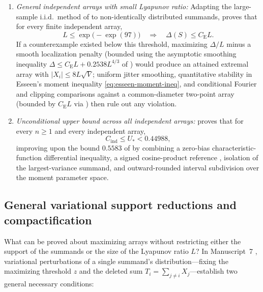 \documentclass[11pt]{article}
\numberwithin{equation}{section}
\theoremstyle{definition}
\theoremstyle{remark}
\newcommand{\ce}{C_{\mathrm E}}
\newcommand{\Cind}{C_{\mathrm{ind}}}
\begin{document}
\begin{enumerate}[label=(\arabic*),leftmargin=2em]
\item \emph{General independent arrays with small Lyapunov ratio:}
Adapting the large-sample i.i.d.\ method of \citet{HeCheng2026} to
non-identically distributed summands, \citet[Theorem~1.1]{BellSmall2026}
proves that for every finite independent array,
\begin{equation}\label{eq:small-lyapunov-value}
 L\le\exp\bigl(-\exp(97)\bigr)
 \quad\Longrightarrow\quad
 \Delta(S)\le\ce L.
\end{equation}
If a counterexample existed below this threshold, maximizing $\Delta/L$ minus
a smooth localization penalty (bounded using the asymptotic smoothing
inequality $\Delta\le\ce L+0.2538L^{4/3}$ of \citealp[Corollary~4.18]{Shevtsova2012})
would produce an attained extremal array with $|X_i|\le 8L\sqrt V$; uniform
jitter smoothing, quantitative stability in Esseen's moment inequality
\eqref{eq:esseen-moment-ineq}, and conditional Fourier and clipping
comparisons against a common-diameter two-point array (bounded by $\ce L$ via
\citealp[Theorem~1.2(ii)]{BellFinite2026}) then rule out any violation.

\item \emph{Unconditional upper bound across all independent arrays:}
\citet[Theorem~1.1]{BellIndependent2026} proves that for every $n\ge1$ and
every independent array,
\begin{equation}\label{eq:unconditional-upper}
 \Cind\le U_*<0.44988,
\end{equation}
improving upon the bound $0.5583$ of \citet{Shevtsova2013} by combining a
zero-bias characteristic-function differential inequality, a signed cosine-product
reference \citep{MattnerShevtsova2019}, isolation of the largest-variance
summand, and outward-rounded interval subdivision over the moment parameter
space.
\end{enumerate}

\subsection{General variational support reductions and compactification}\label{subsec:variational}

What can be proved about maximizing arrays without restricting either the
support of the summands or the size of the Lyapunov ratio $L$? In
Manuscript~7 \citep{BellExtremizers2026}, variational perturbations of a
single summand's distribution---fixing the maximizing threshold $z$ and the
deleted sum $T_i=\sum_{j\ne i}X_j$---establish two general necessary
conditions:
\end{document}
